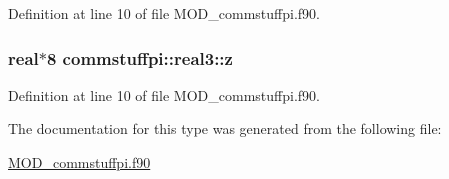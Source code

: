 Definition at line 10 of file M\-O\-D\-\_\-commstuffpi.\-f90.

\hypertarget{structcommstuffpi_1_1real3_a526f3664ab39affe6a04a39c2008aad7}{
\subsubsection[{z}]{\setlength{\rightskip}{0pt plus 5cm}real$\ast$8 commstuffpi\-::real3\-::z}}\label{structcommstuffpi_1_1real3_a526f3664ab39affe6a04a39c2008aad7}


Definition at line 10 of file M\-O\-D\-\_\-commstuffpi.\-f90.



The documentation for this type was generated from the following file\-:\begin{DoxyCompactItemize}
\item 
\hyperlink{MOD__commstuffpi_8f90}{M\-O\-D\-\_\-commstuffpi.\-f90}\end{DoxyCompactItemize}
